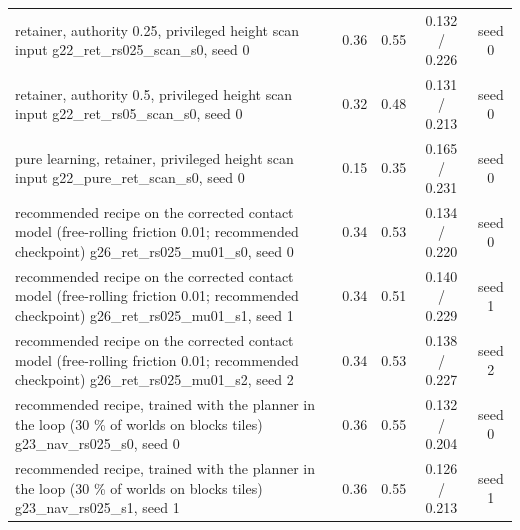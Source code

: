 \begin{table}[t]
{\begin{tabular}{lcccc}
retainer, authority 0.25, privileged height scan input g22\_ret\_rs025\_scan\_s0, seed 0 & 0.36 & 0.55 & 0.132 / 0.226 & seed 0\\
retainer, authority 0.5, privileged height scan input g22\_ret\_rs05\_scan\_s0, seed 0 & 0.32 & 0.48 & 0.131 / 0.213 & seed 0\\
pure learning, retainer, privileged height scan input g22\_pure\_ret\_scan\_s0, seed 0 & 0.15 & 0.35 & 0.165 / 0.231 & seed 0\\
recommended recipe on the corrected contact model (free-rolling friction 0.01; recommended checkpoint) g26\_ret\_rs025\_mu01\_s0, seed 0 & 0.34 & 0.53 & 0.134 / 0.220 & seed 0\\
recommended recipe on the corrected contact model (free-rolling friction 0.01; recommended checkpoint) g26\_ret\_rs025\_mu01\_s1, seed 1 & 0.34 & 0.51 & 0.140 / 0.229 & seed 1\\
recommended recipe on the corrected contact model (free-rolling friction 0.01; recommended checkpoint) g26\_ret\_rs025\_mu01\_s2, seed 2 & 0.34 & 0.53 & 0.138 / 0.227 & seed 2\\
recommended recipe, trained with the planner in the loop (30 \% of worlds on blocks tiles) g23\_nav\_rs025\_s0, seed 0 & 0.36 & 0.55 & 0.132 / 0.204 & seed 0\\
recommended recipe, trained with the planner in the loop (30 \% of worlds on blocks tiles) g23\_nav\_rs025\_s1, seed 1 & 0.36 & 0.55 & 0.126 / 0.213 & seed 1\\
\bottomrule\end{tabular}}
\end{table}
